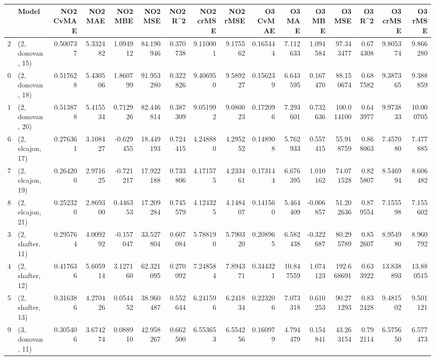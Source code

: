 \begin{tabular}{llrrrrrrrrrrrrrr}
\toprule
{} &             Model &  NO2 CvMAE &   NO2 MAE &   NO2 MBE &    NO2 MSE &   NO2 R\textasciicircum2 &  NO2 crMSE &  NO2 rMSE &  O3 CvMAE &     O3 MAE &    O3 MBE &      O3 MSE &    O3 R\textasciicircum2 &   O3 crMSE &    O3 rMSE \\
\midrule
2  &  (2, donovan, 15) &   0.500737 &  5.332482 &  1.094912 &  84.190946 &  0.370738 &   9.110001 &  9.175562 &  0.165444 &   7.112633 &  1.094584 &   97.343477 &  0.674308 &   9.805374 &   9.866280 \\
0  &  (2, donovan, 18) &   0.517628 &  5.430506 &  1.860799 &  91.953280 &  0.322826 &   9.406950 &  9.589227 &  0.156239 &   6.643595 &  0.167470 &   88.150674 &  0.687582 &   9.387365 &   9.388859 \\
1  &  (2, donovan, 20) &   0.513878 &  5.415534 &  0.712926 &  82.446814 &  0.387309 &   9.051992 &  9.080023 &  0.172096 &   7.293601 &  0.732636 &  100.014100 &  0.643977 &   9.973833 &  10.000705 \\
6  &  (2, elcajon, 17) &   0.276361 &  3.108427 & -0.629455 &  18.449193 &  0.724415 &   4.248880 &  4.295252 &  0.148908 &   5.762933 &  0.557415 &   55.918759 &  0.868063 &   7.457080 &   7.477885 \\
7  &  (2, elcajon, 19) &   0.264200 &  2.971625 & -0.721217 &  17.922188 &  0.733806 &   4.171575 &  4.233461 &  0.173144 &   6.676395 &  1.010162 &   74.071528 &  0.825807 &   8.546994 &   8.606482 \\
8  &  (2, elcajon, 21) &   0.252320 &  2.869300 &  0.446353 &  17.209284 &  0.745579 &   4.124325 &  4.148407 &  0.141560 &   5.464409 & -0.006857 &   51.202636 &  0.879554 &   7.155598 &   7.155602 \\
3  &  (2, shafter, 11) &   0.295764 &  4.009292 & -0.157047 &  33.527804 &  0.607084 &   5.788190 &  5.790320 &  0.208965 &   6.582438 & -0.322687 &   80.295789 &  0.852607 &   8.954980 &   8.960792 \\
4  &  (2, shafter, 12) &   0.417636 &  5.605914 &  3.127160 &  62.321095 &  0.270092 &   7.248584 &  7.894371 &  0.344321 &  10.847559 &  1.074123 &  192.668691 &  0.633922 &  13.838893 &  13.880515 \\
5  &  (2, shafter, 13) &   0.316386 &  4.270426 &  0.054452 &  38.960487 &  0.552644 &   6.241596 &  6.241834 &  0.223206 &   7.073318 &  0.610253 &   90.271293 &  0.832428 &   9.481502 &   9.501121 \\
9  &  (3, donovan, 11) &   0.305406 &  3.674274 &  0.088910 &  42.958267 &  0.662500 &   6.553653 &  6.554256 &  0.160979 &   4.794479 &  0.154841 &   43.263154 &  0.792114 &   6.575650 &   6.577473 \\

\end{tabular}
